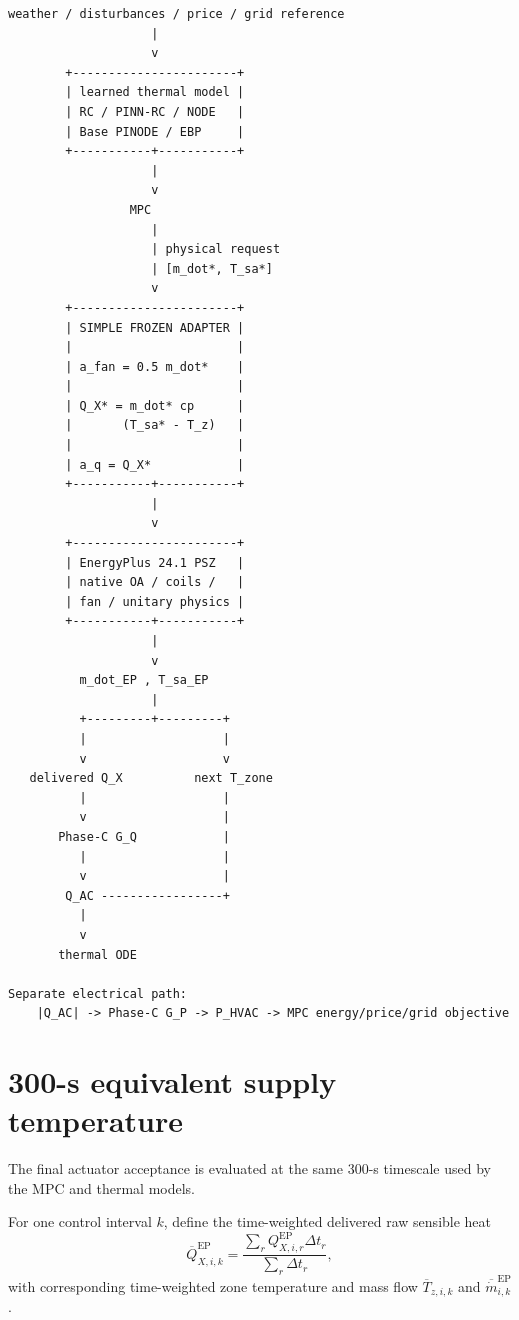 \documentclass[11pt]{article}
\newcommand{\mdot}{\dot m}
\begin{document}
\begin{verbatim}
weather / disturbances / price / grid reference
                    |
                    v
        +-----------------------+
        | learned thermal model |
        | RC / PINN-RC / NODE   |
        | Base PINODE / EBP     |
        +-----------+-----------+
                    |
                    v
                 MPC
                    |
                    | physical request
                    | [m_dot*, T_sa*]
                    v
        +-----------------------+
        | SIMPLE FROZEN ADAPTER |
        |                       |
        | a_fan = 0.5 m_dot*    |
        |                       |
        | Q_X* = m_dot* cp      |
        |       (T_sa* - T_z)   |
        |                       |
        | a_q = Q_X*            |
        +-----------+-----------+
                    |
                    v
        +-----------------------+
        | EnergyPlus 24.1 PSZ   |
        | native OA / coils /   |
        | fan / unitary physics |
        +-----------+-----------+
                    |
                    v
          m_dot_EP , T_sa_EP
                    |
          +---------+---------+
          |                   |
          v                   v
   delivered Q_X          next T_zone
          |                   |
          v                   |
       Phase-C G_Q            |
          |                   |
          v                   |
        Q_AC -----------------+
          |
          v
       thermal ODE

Separate electrical path:
    |Q_AC| -> Phase-C G_P -> P_HVAC -> MPC energy/price/grid objective
\end{verbatim}

\section{300-s equivalent supply temperature}

The final actuator acceptance is evaluated at the same 300-s timescale used by
the MPC and thermal models.

For one control interval $k$, define the time-weighted delivered raw sensible
heat
\begin{equation}
\overline{Q}_{X,i,k}^{\mathrm{EP}}
=
\frac{
\sum_r Q_{X,i,r}^{\mathrm{EP}}\Delta t_r
}{
\sum_r \Delta t_r
},
\end{equation}
with corresponding time-weighted zone temperature and mass flow
$\overline{T}_{z,i,k}$ and $\overline{\mdot}_{i,k}^{\mathrm{EP}}$.
\end{document}
